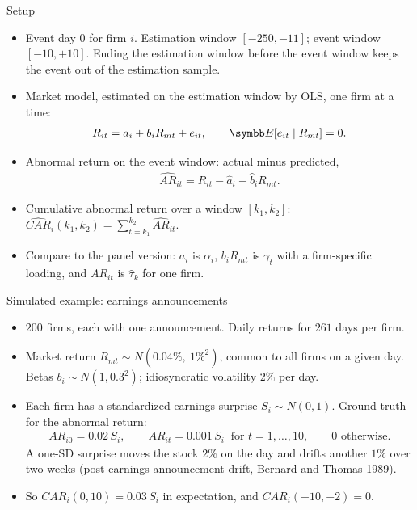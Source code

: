 \documentclass[aspectratio=169,11pt]{beamer}
\begin{document}
\begin{frame}{Setup}
\begin{itemize}
	\item Event day $0$ for firm $i$. \alert{Estimation window} $[-250, -11]$; \alert{event window}
	$[-10, +10]$. Ending the estimation window before the event window keeps the event out of the estimation sample.
	\medskip
	\item \alert{Market model}, estimated on the estimation window by OLS, one firm at a time:
	\begin{align*}
		R_{it} = a_i + b_i R_{mt} + e_{it}, \qquad \E[e_{it} \mid R_{mt}] = 0 .
	\end{align*}
	\medskip
	\item \alert{Abnormal return} on the event window: actual minus predicted,
	\begin{align*}
		\widehat{AR}_{it} = R_{it} - \hat a_i - \hat b_i R_{mt} .
	\end{align*}
	\medskip
	\item \alert{Cumulative abnormal return} over a window $[k_1, k_2]$:
	$\widehat{CAR}_i(k_1, k_2) = \sum_{t = k_1}^{k_2} \widehat{AR}_{it}$.
	\item Compare to the panel version: $a_i$ is $\alpha_i$, $b_i R_{mt}$ is $\gamma_t$ with a
	firm-specific loading, and $AR_{it}$ is $\hat\tau_k$ for one firm.
\end{itemize}
\end{frame}


\begin{frame}{Simulated example: earnings announcements}
\begin{itemize}
	\item $200$ firms, each with one announcement. Daily returns for $261$ days per firm.
	\medskip
	\item Market return $R_{mt} \sim N(0.04\%,\ 1\%^2)$, common to all firms on a given day.
	Betas $b_i \sim N(1, 0.3^2)$; idiosyncratic volatility $2\%$ per day.
	\medskip
	\item Each firm has a standardized \alert{earnings surprise} $S_i \sim N(0, 1)$.
	Ground truth for the abnormal return:
	\begin{align*}
		AR_{i0} = 0.02\, S_i, \qquad AR_{it} = 0.001\, S_i \ \text{ for } t = 1, \dots, 10, \qquad 0 \text{ otherwise}.
	\end{align*}
	A one-SD surprise moves the stock $2\%$ on the day and drifts another $1\%$ over two weeks
	(post-earnings-announcement drift, Bernard and Thomas 1989).
	\medskip
	\item So $CAR_i(0, 10) = 0.03\, S_i$ in expectation, and $CAR_i(-10, -2) = 0$.
\end{itemize}
\end{frame}
\end{document}
